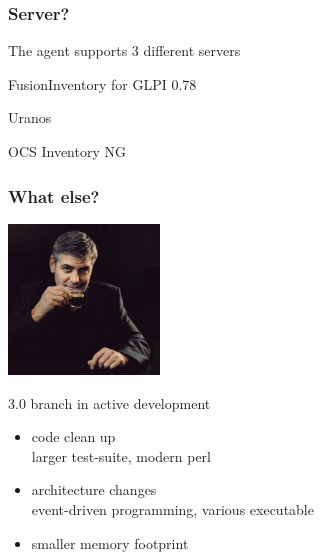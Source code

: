 \begin{frame}
    \frametitle{Server?}

    \pause

    \begin{block}{The agent supports 3 different servers}
        \begin{description}
            \item FusionInventory for GLPI 0.78
            \item Uranos
            \item OCS Inventory NG
        \end{description}
    \end{block}
\end{frame}



\begin{frame}
    \frametitle{What else?}

    \begin{center}
    \includegraphics[height=4.0cm]{pics/whatelse.jpg}
    \end{center}

    \pause

    \begin{block}{3.0 branch in active development}
        \begin{itemize}
            \item code clean up\\
            {\small larger test-suite, modern perl}
            \item architecture changes\\
            {\small event-driven programming, various executable}
            \item smaller memory footprint
        \end{itemize}
    \end{block}
\end{frame}


